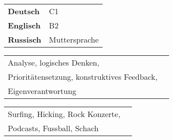 \begin{minipage}[t]{0.25\textwidth}
  \vspace{-\baselineskip}


  \begin{tabular}{ll}
    \textbf{Deutsch}   & C1 \\
    \textbf{Englisch} & B2  \\
    \textbf{Russisch}    & Muttersprache
  \end{tabular}
\end{minipage}
\hfill
\begin{minipage}[t]{0.35\textwidth}
  \vspace{-\baselineskip}


  \begin{tabular}{ll}
    Analyse, logisches Denken,\\Prioritätensetzung, konstruktives Feedback,\\Eigenverantwortung
  \end{tabular}
\end{minipage}
\begin{minipage}[t]{0.35\textwidth}
  \vspace{-\baselineskip}

  
  \begin{tabular}{ll}
    Surfing, Hicking, Rock Konzerte,\\Podcasts, Fussball, Schach
  \end{tabular}
  
\end{minipage}


